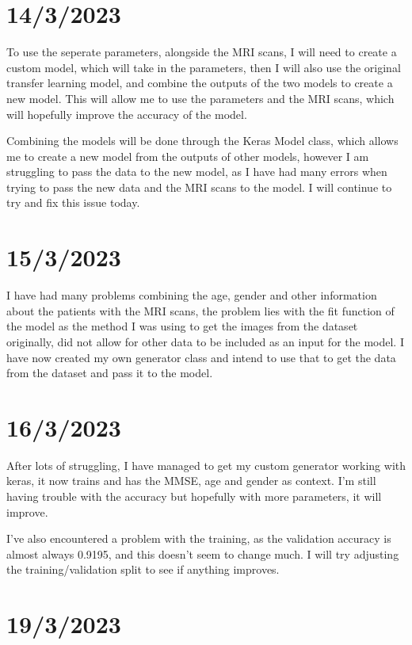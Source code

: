 \documentclass[]{final_report}
\begin{document}
\section*{14/3/2023}

To use the seperate parameters, alongside the MRI scans, I will need to create a custom model, which will take in the parameters, then I will also use the original transfer learning model, and combine the outputs of the two models to create a new model. This will allow me to use the parameters and the MRI scans, which will hopefully improve the accuracy of the model.

Combining the models will be done through the Keras Model class, which allows me to create a new model from the outputs of other models, however I am struggling to pass the data to the new model, as I have had many errors when trying to pass the new data and the MRI scans to the model. I will continue to try and fix this issue today.

\section*{15/3/2023}

I have had many problems combining the age, gender and other information about the patients with the MRI scans, the problem lies with the fit function of the model as the method I was using to get the images from the dataset originally, did not allow for other data to be included as an input for the model. I have now created my own generator class and intend to use that to get the data from the dataset and pass it to the model.

\section*{16/3/2023}

After lots of struggling, I have managed to get my custom generator working with keras, it now trains and has the MMSE, age and gender as context. I'm still having trouble with the accuracy but hopefully with more parameters, it will improve.

I've also encountered a problem with the training, as the validation accuracy is almost always 0.9195, and this doesn't seem to change much. I will try adjusting the training/validation split to see if anything improves.

\section*{19/3/2023}
\end{document}
